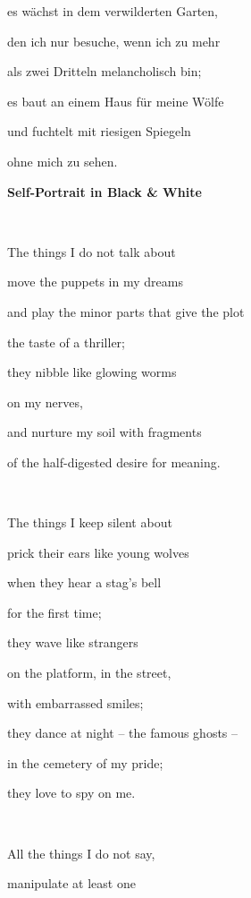 es wächst in dem verwilderten Garten,

den ich nur besuche, wenn ich zu mehr 

als zwei Dritteln melancholisch bin;

es baut an einem Haus für meine Wölfe \ 

und fuchtelt mit riesigen Spiegeln

ohne mich zu sehen.


\bigskip


\bigskip


\bigskip


\bigskip


\bigskip


\bigskip


\bigskip


\bigskip


\bigskip


\bigskip


\bigskip

{\bfseries
Self-Portrait in Black \& White}

~

The things I do not talk about

move the puppets in my dreams

and play the minor parts that give the plot 

the taste of a thriller;

they nibble like glowing worms

on my nerves,

and nurture my soil with fragments

of the half-digested desire for meaning.

~

The things I keep silent about

prick their ears like young wolves

when they hear a stag's bell

for the first time;

they wave like strangers

on the platform, in the street,

with embarrassed smiles;

they dance at night -- the famous ghosts -- 

in the cemetery of my pride;

they love to spy on me.

~

All the things I do not say,

manipulate at least one


